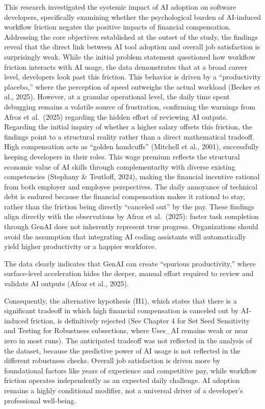 \documentclass[
]{article}
\begin{document}
This research investigated the systemic impact of AI adoption on
software developers, specifically examining whether the psychological
burden of AI-induced workflow friction negates the positive impacts of
financial compensation. Addressing the core objectives established at
the outset of the study, the findings reveal that the direct link
between AI tool adoption and overall job satisfaction is surprisingly
weak. While the initial problem statement questioned how workflow
friction interacts with AI usage, the data demonstrates that at a broad
career level, developers look past this friction. This behavior is
driven by a ``productivity placebo,'' where the perception of speed
outweighs the actual workload (Becker et al., 2025). However, at a
granular operational level, the daily time spent debugging remains a
volatile source of frustration, confirming the warnings from Afroz et
al.~(2025) regarding the hidden effort of reviewing AI outputs.
Regarding the initial inquiry of whether a higher salary offsets this
friction, the findings point to a structural reality rather than a
direct mathematical tradeoff. High compensation acts as ``golden
handcuffs'' (Mitchell et al., 2001), successfully keeping developers in
their roles. This wage premium reflects the structural economic value of
AI skills through complementarity with diverse existing competencies
(Stephany \& Teutloff, 2024), making the financial incentive rational
from both employer and employee perspectives. The daily annoyance of
technical debt is endured because the financial compensation makes it
rational to stay, rather than the friction being directly ``canceled
out'' by the pay. These findings align directly with the observations by
Afroz et al.~(2025): faster task completion through GenAI does not
inherently represent true progress. Organizations should avoid the
assumption that integrating AI coding assistants will automatically
yield higher productivity or a happier workforce.

The data clearly indicates that GenAI can create ``spurious
productivity,'' where surface-level acceleration hides the deeper,
manual effort required to review and validate AI outputs (Afroz et al.,
2025).

Consequently, the alternative hypothesis (H1), which states that there
is a significant tradeoff in which high financial compensation is
canceled out by AI-induced friction, is definitively rejected (See
Chapter 4 for Set Seed Sensitivity and Testing for Robustness
subsections, where Uses\_AI remains weak or near zero in most runs). The
anticipated tradeoff was not reflected in the analysis of the dataset,
because the predictive power of AI usage is not reflected in the
different robustness checks. Overall job satisfaction is driven more by
foundational factors like years of experience and competitive pay, while
workflow friction operates independently as an expected daily challenge.
AI adoption remains a highly conditional modifier, not a universal
driver of a developer's professional well-being.
\end{document}
